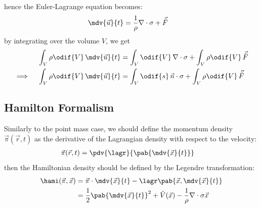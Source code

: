 hence the Euler-Lagrange equation becomes:
\begin{align}
  \mdv{\vec{u}}{t} & = \frac{1}{\rho} \nabla \cdot \sigma + \vec{\tilde{F}}
\end{align}
by integrating over the volume $V$, we get
\begin{align}
  \int_V \rho \odif{V} \, \mdv{\vec{u}}{t}                & = \int_V \odif{V} \, \nabla \cdot \sigma + \int_V \rho \odif{V} \, \vec{\tilde{F}}  \\
  \implies \quad \int_V \rho \odif{V} \, \mdv{\vec{u}}{t} & = \int_V \odif{s} \, \vec{n} \cdot \sigma + \int_V \rho \odif{V} \, \vec{\tilde{F}}
\end{align}


\subsection{Hamilton Formalism}
Similarly to the point mass case, we should define the momentum density $\vec{\pi}(\vec{r}, t)$ as the derivative of the Lagrangian density with respect to the velocity:
\begin{align}
  \vec{\pi} (\vec{r}, t) & = \pdv{\lagr}{\pab{\mdv{\vec{x}}{t}}}
\end{align}
then the Hamiltonian density should be defined by the Legendre transformation:
\begin{align}
  \hami(\vec{\pi}, \vec{x}) & = \vec{\pi} \cdot \mdv{\vec{x}}{t} - \lagr \pab{\vec{x}, \mdv{\vec{x}}{t}}                               \\
                            & = \frac{1}{2} \pab{\mdv{\vec{x}}{t}}^2 + \tilde{V}(\vec{x}) - \frac{1}{\rho} \nabla \cdot \sigma \vec{x}
\end{align}




\cite{suzuki-leastActionFluid}



